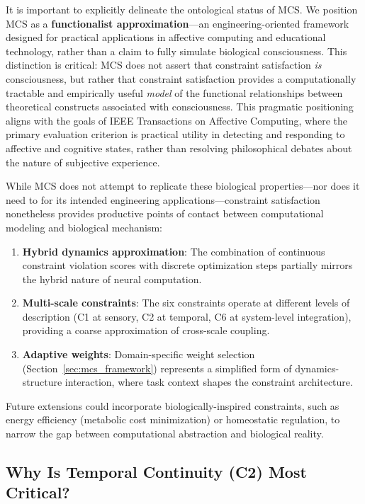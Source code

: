 \documentclass[10pt,journal,compsoc]{IEEEtran}
\begin{document}
It is important to explicitly delineate the ontological status of MCS. We position MCS as a \textbf{functionalist approximation}—an engineering-oriented framework designed for practical applications in affective computing and educational technology, rather than a claim to fully simulate biological consciousness. This distinction is critical: MCS does not assert that constraint satisfaction \textit{is} consciousness, but rather that constraint satisfaction provides a computationally tractable and empirically useful \textit{model} of the functional relationships between theoretical constructs associated with consciousness. This pragmatic positioning aligns with the goals of IEEE Transactions on Affective Computing, where the primary evaluation criterion is practical utility in detecting and responding to affective and cognitive states, rather than resolving philosophical debates about the nature of subjective experience.

While MCS does not attempt to replicate these biological properties—nor does it need to for its intended engineering applications—constraint satisfaction nonetheless provides productive points of contact between computational modeling and biological mechanism:

\begin{enumerate}
    \item \textbf{Hybrid dynamics approximation}: The combination of continuous constraint violation scores with discrete optimization steps partially mirrors the hybrid nature of neural computation.
    \item \textbf{Multi-scale constraints}: The six constraints operate at different levels of description (C1 at sensory, C2 at temporal, C6 at system-level integration), providing a coarse approximation of cross-scale coupling.
    \item \textbf{Adaptive weights}: Domain-specific weight selection (Section~\ref{sec:mcs_framework}) represents a simplified form of dynamics-structure interaction, where task context shapes the constraint architecture.
\end{enumerate}

Future extensions could incorporate biologically-inspired constraints, such as energy efficiency (metabolic cost minimization) or homeostatic regulation, to narrow the gap between computational abstraction and biological reality.

\subsection{Why Is Temporal Continuity (C2) Most Critical?}
\end{document}
